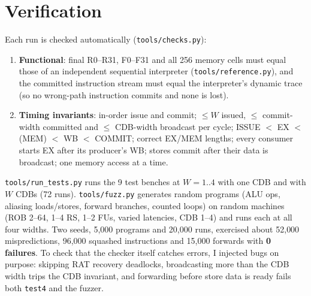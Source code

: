 \documentclass[11pt]{article}
\begin{document}
\section{Verification}
Each run is checked automatically (\texttt{tools/checks.py}):
\begin{enumerate}
  \item \textbf{Functional}: final R0--R31, F0--F31 and all 256 memory cells must equal those of an
        independent sequential interpreter (\texttt{tools/reference.py}), and the committed
        instruction stream must equal the interpreter's dynamic trace (so no wrong-path
        instruction commits and none is lost).
  \item \textbf{Timing invariants}: in-order issue and commit; $\le W$ issued, $\le$ commit-width
        committed and $\le$ CDB-width broadcast per cycle; ISSUE $<$ EX $<$ (MEM) $<$ WB $<$
        COMMIT; correct EX/MEM lengths; every consumer starts EX after its producer's WB; stores
        commit after their data is broadcast; one memory access at a time.
\end{enumerate}
\texttt{tools/run\_tests.py} runs the 9 test benches at $W = 1..4$ with one CDB and with $W$ CDBs
(72 runs). \texttt{tools/fuzz.py} generates random programs (ALU ops, aliasing loads/stores, forward
branches, counted loops) on random machines (ROB 2--64, 1--4 RS, 1--2 FUs, varied latencies,
CDB 1--4) and runs each at all four widths. Two seeds, 5{,}000 programs and 20{,}000 runs, exercised
about 52{,}000 mispredictions, 96{,}000 squashed instructions and 15{,}000 forwards with
\textbf{0 failures}. To check that the checker itself catches errors, I injected bugs on purpose:
skipping RAT recovery deadlocks, broadcasting more than the CDB width trips the CDB invariant, and
forwarding before store data is ready fails both \texttt{test4} and the fuzzer.
\end{document}
